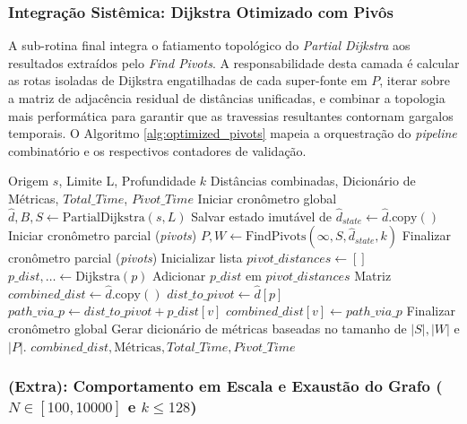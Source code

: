 \documentclass[10pt,a4paper]{article}
\begin{document}
\subsubsection{Integração Sistêmica: Dijkstra Otimizado com Pivôs}

A sub-rotina final integra o fatiamento topológico do \textit{Partial Dijkstra} aos resultados extraídos pelo \textit{Find Pivots}. A responsabilidade desta camada é calcular as rotas isoladas de Dijkstra engatilhadas de cada super-fonte em $P$, iterar sobre a matriz de adjacência residual de distâncias unificadas, e combinar a topologia mais performática para garantir que as travessias resultantes contornam gargalos temporais. O Algoritmo \ref{alg:optimized_pivots} mapeia a orquestração do \textit{pipeline} combinatório e os respectivos contadores de validação.

\begin{algorithm}[H]
\caption{Dijkstra Otimizado via Pivôs Unificados}\label{alg:optimized_pivots}
\begin{algorithmic}[1]
\Require Origem $s$, Limite L, Profundidade $k$
\Ensure Distâncias combinadas, Dicionário de Métricas, $Total\_Time$, $Pivot\_Time$
\State Iniciar cronômetro global
\State $\hat{d}, B, S \gets \text{PartialDijkstra}(s, L)$
\State Salvar estado imutável de $\hat{d}_{state} \gets \hat{d}.\text{copy}()$
\State Iniciar cronômetro parcial (\textit{pivots})
\State $P, W \gets \text{FindPivots}(\infty, S, \hat{d}_{state}, k)$
\State Finalizar cronômetro parcial (\textit{pivots})
\State Inicializar lista $pivot\_distances \gets []$
    \State $p\_dist, \dots \gets \text{Dijkstra}(p)$ 
    \State Adicionar $p\_dist$ em $pivot\_distances$
\EndFor
\State Matriz $combined\_dist \gets \hat{d}.\text{copy}()$
    \State $dist\_to\_pivot \gets \hat{d}[p]$
        \State $path\_via\_p \gets dist\_to\_pivot + p\_dist[v]$
            \State $combined\_dist[v] \gets path\_via\_p$
        \EndIf
    \EndFor
\EndFor
\State Finalizar cronômetro global
\State Gerar dicionário de métricas baseadas no tamanho de $|S|, |W|$ e $|P|$.
\State \Return $combined\_dist, \text{Métricas}, Total\_Time, Pivot\_Time$
\end{algorithmic}
\end{algorithm}


\subsubsection{(Extra): Comportamento em Escala e Exaustão do Grafo ($N \in [100, 10000]$ e $k \le 128$)}
\end{document}
